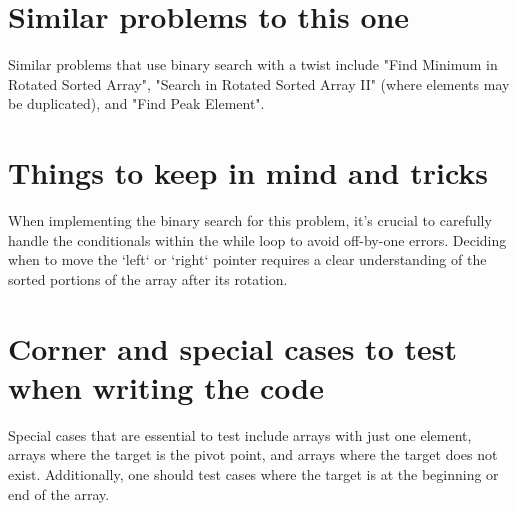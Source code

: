 \section*{Similar problems to this one}
Similar problems that use binary search with a twist include "Find Minimum in Rotated Sorted Array", "Search in Rotated Sorted Array II" (where elements may be duplicated), and "Find Peak Element".

\section*{Things to keep in mind and tricks}
When implementing the binary search for this problem, it's crucial to carefully handle the conditionals within the while loop to avoid off-by-one errors. Deciding when to move the `left` or `right` pointer requires a clear understanding of the sorted portions of the array after its rotation.

\section*{Corner and special cases to test when writing the code}
Special cases that are essential to test include arrays with just one element, arrays where the target is the pivot point, and arrays where the target does not exist. Additionally, one should test cases where the target is at the beginning or end of the array.